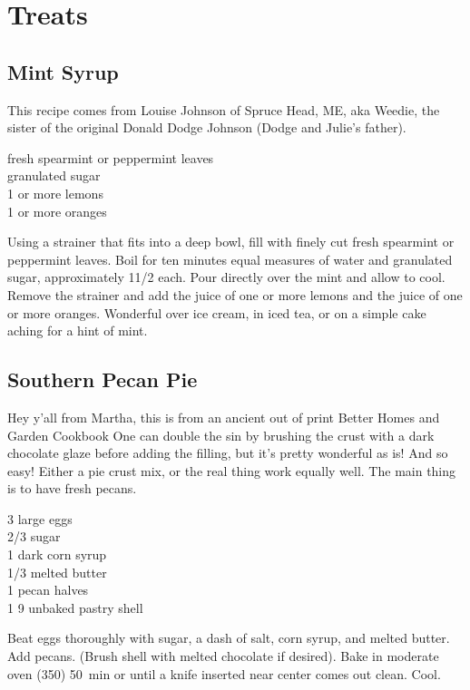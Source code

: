 \chapter{Treats}

\section{Mint Syrup}

\begin{open}
    This recipe comes from Louise Johnson of Spruce Head, ME, aka Weedie, the sister of the original Donald Dodge Johnson (Dodge and Julie’s father).
\end{open}
\begin{ingredients}
    fresh spearmint or peppermint leaves\\
    granulated sugar\\
    1 or more lemons\\
    1 or more oranges
\end{ingredients}
Using a strainer that fits into a deep bowl, fill with finely cut fresh spearmint or peppermint leaves. Boil for ten minutes equal measures of water and granulated sugar, approximately 1\SI{1/2}{\cup} each. Pour directly over the mint and allow to cool. Remove the strainer and add the juice of one or more lemons and the juice of one or more oranges. Wonderful over ice cream, in iced tea, or on a simple cake aching for a hint of mint.

\section{Southern Pecan Pie}

\begin{open}
    Hey y'all from Martha, this is from an ancient out of print Better Homes and
    Garden Cookbook One can double the sin by brushing the crust with a dark
    chocolate glaze before adding the filling, but it's pretty wonderful as is!
    And so easy! Either a pie crust mix, or the real thing work equally well.
    The main thing is to have fresh pecans.
\end{open}
\begin{ingredients}
    3 large eggs\\
    \SI{2/3}{\cup} sugar\\
    \SI{1}{\cup} dark corn syrup\\
    \SI{1/3}{\cup} melted butter\\
    \SI{1}{\cup} pecan halves\\
    1 \SI{9}{\inch} unbaked pastry shell
\end{ingredients}
Beat eggs thoroughly with sugar, a dash of salt, corn syrup, and melted butter.
Add pecans. (Brush shell with melted chocolate if desired). Bake in moderate
oven (\SI{350}{\degreeF}) \SI{50}{\minute} or until a knife inserted near center
comes out clean. Cool.

